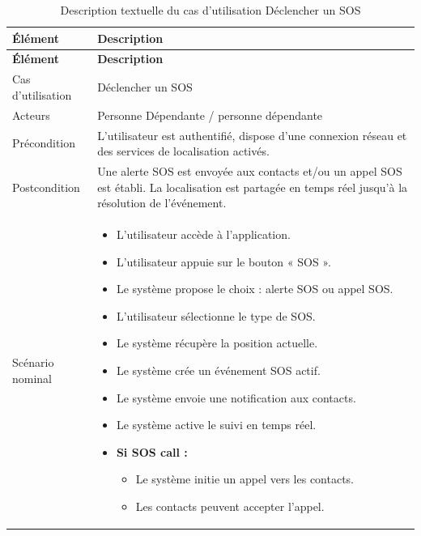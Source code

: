 \small
\renewcommand{\arraystretch}{1.1}
\setlength{\parskip}{0pt}
\begin{longtable}{|p{}|>{\raggedright\arraybackslash}p{}|}
\caption{Description textuelle du cas d'utilisation Déclencher un SOS} \\ \hline
\textbf{Élément} & \textbf{Description} \\ \hline
\endfirsthead

\hline
\textbf{Élément} & \textbf{Description} \\ \hline
\endhead

\hline
\endlastfoot

Cas d'utilisation & Déclencher un SOS \\ \hline

Acteurs & Personne Dépendante / personne dépendante \\ \hline

Précondition & L’utilisateur est authentifié, dispose d’une connexion réseau et des services de localisation activés. \\ \hline

Postcondition & Une alerte SOS est envoyée aux contacts et/ou un appel SOS est établi. La localisation est partagée en temps réel jusqu’à la résolution de l’événement. \\ \hline

Scénario nominal &
\begin{itemize}
\item L’utilisateur accède à l’application.
\item L’utilisateur appuie sur le bouton « SOS ».
\item Le système propose le choix : alerte SOS ou appel SOS.
\item L’utilisateur sélectionne le type de SOS.

\item Le système récupère la position actuelle.

\item Le système crée un événement SOS actif.

\item Le système envoie une notification aux contacts.

\item Le système active le suivi en temps réel.

\item \textbf{Si SOS call :}
\begin{itemize}
\item Le système initie un appel vers les contacts.
\item Les contacts peuvent accepter l’appel.
\end{itemize}


\end{itemize}
\end{longtable}
